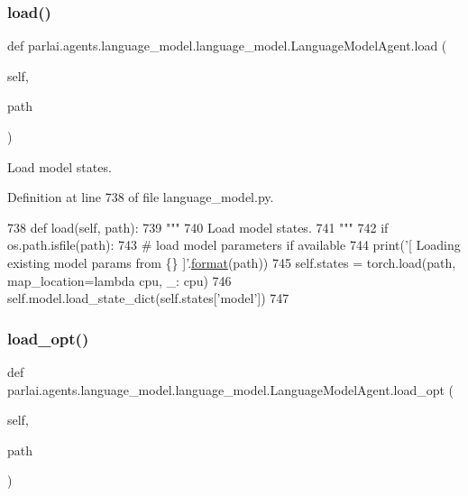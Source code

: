 \subsubsection{\texorpdfstring{load()}{load()}}
{\footnotesize\ttfamily def parlai.\+agents.\+language\+\_\+model.\+language\+\_\+model.\+Language\+Model\+Agent.\+load (\begin{DoxyParamCaption}\item[{}]{self,  }\item[{}]{path }\end{DoxyParamCaption})}

\begin{DoxyVerb}Load model states.
\end{DoxyVerb}
 

Definition at line 738 of file language\+\_\+model.\+py.


\begin{DoxyCode}
738     \textcolor{keyword}{def }load(self, path):
739         \textcolor{stringliteral}{"""}
740 \textcolor{stringliteral}{        Load model states.}
741 \textcolor{stringliteral}{        """}
742         \textcolor{keywordflow}{if} os.path.isfile(path):
743             \textcolor{comment}{# load model parameters if available}
744             print(\textcolor{stringliteral}{'[ Loading existing model params from \{\} ]'}.\hyperlink{namespaceparlai_1_1chat__service_1_1services_1_1messenger_1_1shared__utils_a32e2e2022b824fbaf80c747160b52a76}{format}(path))
745             self.states = torch.load(path, map\_location=\textcolor{keyword}{lambda} cpu, \_: cpu)
746             self.model.load\_state\_dict(self.states[\textcolor{stringliteral}{'model'}])
747 \end{DoxyCode}
\mbox{\label{classparlai_1_1agents_1_1language__model_1_1language__model_1_1LanguageModelAgent_a8f879ddce0947b8b56f980f7f4fea07b}} 
\subsubsection{\texorpdfstring{load\+\_\+opt()}{load\_opt()}}
{\footnotesize\ttfamily def parlai.\+agents.\+language\+\_\+model.\+language\+\_\+model.\+Language\+Model\+Agent.\+load\+\_\+opt (\begin{DoxyParamCaption}\item[{}]{self,  }\item[{}]{path }\end{DoxyParamCaption})}

